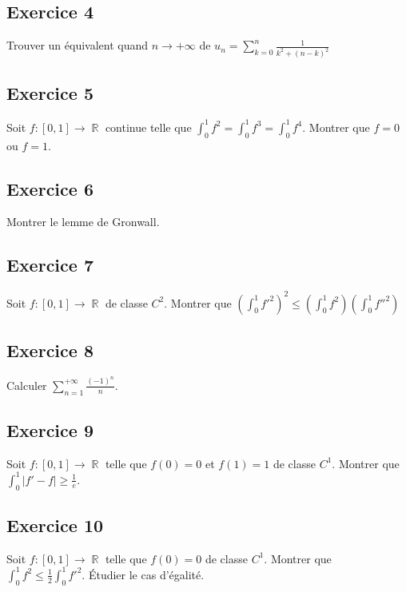 \documentclass{article}
\DeclareMathOperator{\R}{\mathbb{R}}
\begin{document}
\subsection*{Exercice 4} 

Trouver un équivalent quand $n \to +\infty$ de $u_n = \displaystyle\sum_{k=0}^n{\frac{1}{k^2 + (n-k)^2}}$ 

\subsection*{Exercice 5} 

Soit $f : [0, 1] \to \R$ continue telle que $\displaystyle\int_0^1{f^2} = \int_0^1{f^3} = \int_0^1{f^4} $. Montrer que $f = 0$ ou $f = 1$. 

\subsection*{Exercice 6} 

Montrer le lemme de Gronwall. 

\subsection*{Exercice 7} 

Soit $f : [0, 1] \to \R$ de classe $C^2$. Montrer que $\displaystyle \left(\int_0^1{f'^2}\right)^2 \leqslant \left(\int_0^1{f^2}\right)\left(\int_0^1{f''^2}\right) $ 

\subsection*{Exercice 8} 

Calculer $\displaystyle\sum_{n=1}^{+\infty}{\frac{(-1)^n}{n}}$. 

\subsection*{Exercice 9} 

Soit $f : [0, 1] \to \R$ telle que $f(0) = 0$ et $f(1) = 1$ de classe $C^1$. Montrer que $\displaystyle \int_0^1{|f' - f|} \geq \frac{1}{e}$. 

\subsection*{Exercice 10} 

Soit $f : [0, 1] \to \R$ telle que $f(0) = 0$ de classe $C^1$. Montrer que $\displaystyle \int_0^1{f^2} \leq \frac{1}{2}\int_0^1{f'^2} $. Étudier le cas d'égalité. 
\end{document}
